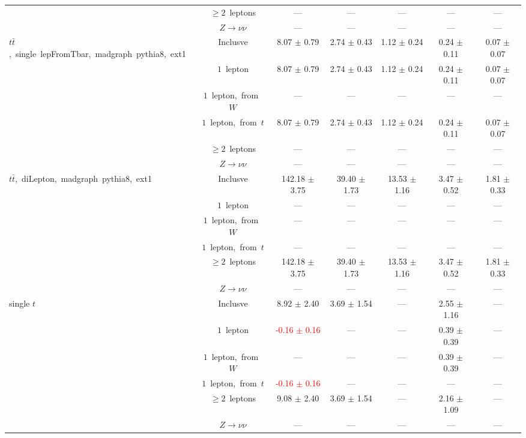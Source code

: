 \documentclass{article}
\begin{document}
\begin{longtable}{|l|c|c|c|c|c|c|}
 & $\ge2$~leptons  & ---  & ---  & ---  & ---  & --- \\* 
 & $Z\rightarrow\nu\nu$  & ---  & ---  & ---  & ---  & --- \\* 
\hline 
\multirow{6}{*}{$t\bar{t}$,~single~lepFromTbar,~madgraph~pythia8,~ext1} & Inclusve  & 8.07 $\pm$ 0.79  & 2.74 $\pm$ 0.43  & 1.12 $\pm$ 0.24  & 0.24 $\pm$ 0.11  & 0.07 $\pm$ 0.07 \\* 
 & $1$~lepton  & 8.07 $\pm$ 0.79  & 2.74 $\pm$ 0.43  & 1.12 $\pm$ 0.24  & 0.24 $\pm$ 0.11  & 0.07 $\pm$ 0.07 \\* 
 & $1$~lepton,~from~$W$  & ---  & ---  & ---  & ---  & --- \\* 
 & $1$~lepton,~from~$t$  & 8.07 $\pm$ 0.79  & 2.74 $\pm$ 0.43  & 1.12 $\pm$ 0.24  & 0.24 $\pm$ 0.11  & 0.07 $\pm$ 0.07 \\* 
 & $\ge2$~leptons  & ---  & ---  & ---  & ---  & --- \\* 
 & $Z\rightarrow\nu\nu$  & ---  & ---  & ---  & ---  & --- \\* 
\hline 
\multirow{6}{*}{$t\bar{t}$,~diLepton,~madgraph~pythia8,~ext1} & Inclusve  & 142.18 $\pm$ 3.75  & 39.40 $\pm$ 1.73  & 13.53 $\pm$ 1.16  & 3.47 $\pm$ 0.52  & 1.81 $\pm$ 0.33 \\* 
 & $1$~lepton  & ---  & ---  & ---  & ---  & --- \\* 
 & $1$~lepton,~from~$W$  & ---  & ---  & ---  & ---  & --- \\* 
 & $1$~lepton,~from~$t$  & ---  & ---  & ---  & ---  & --- \\* 
 & $\ge2$~leptons  & 142.18 $\pm$ 3.75  & 39.40 $\pm$ 1.73  & 13.53 $\pm$ 1.16  & 3.47 $\pm$ 0.52  & 1.81 $\pm$ 0.33 \\* 
 & $Z\rightarrow\nu\nu$  & ---  & ---  & ---  & ---  & --- \\* 
\hline 
\multirow{6}{*}{single $t$} & Inclusve  & 8.92 $\pm$ 2.40  & 3.69 $\pm$ 1.54  & ---  & 2.55 $\pm$ 1.16  & --- \\* 
 & $1$~lepton  & \textcolor{red}{ -0.16 $\pm$ 0.16 }  & ---  & ---  & 0.39 $\pm$ 0.39  & --- \\* 
 & $1$~lepton,~from~$W$  & ---  & ---  & ---  & 0.39 $\pm$ 0.39  & --- \\* 
 & $1$~lepton,~from~$t$  & \textcolor{red}{ -0.16 $\pm$ 0.16 }  & ---  & ---  & ---  & --- \\* 
 & $\ge2$~leptons  & 9.08 $\pm$ 2.40  & 3.69 $\pm$ 1.54  & ---  & 2.16 $\pm$ 1.09  & --- \\* 
 & $Z\rightarrow\nu\nu$  & ---  & ---  & ---  & ---  & --- \\* 

\end{longtable}
\end{document}
